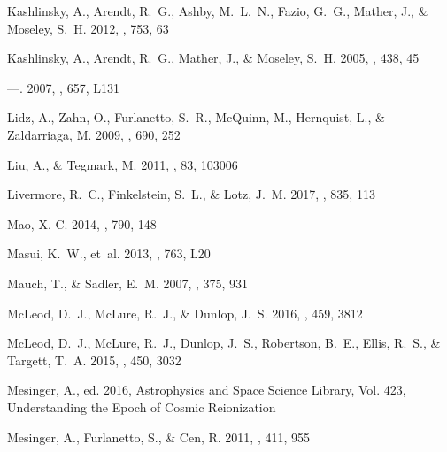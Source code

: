 \documentclass[numberedappendix]{emulateapj}
\begin{document}
\begin{thebibliography}{124}
{Kashlinsky}, A., {Arendt}, R.~G., {Ashby}, M.~L.~N., {Fazio}, G.~G., {Mather},
  J., \& {Moseley}, S.~H. 2012, \apj, 753, 63

{Kashlinsky}, A., {Arendt}, R.~G., {Mather}, J., \& {Moseley}, S.~H. 2005,
  \nat, 438, 45

---. 2007, \apjl, 657, L131

{Lidz}, A., {Zahn}, O., {Furlanetto}, S.~R., {McQuinn}, M., {Hernquist}, L., \&
  {Zaldarriaga}, M. 2009, \apj, 690, 252

{Liu}, A., \& {Tegmark}, M. 2011, \prd, 83, 103006

{Livermore}, R.~C., {Finkelstein}, S.~L., \& {Lotz}, J.~M. 2017, \apj, 835, 113

{Mao}, X.-C. 2014, \apj, 790, 148

{Masui}, K.~W., {et~al.} 2013, \apjl, 763, L20

{Mauch}, T., \& {Sadler}, E.~M. 2007, \mnras, 375, 931

{McLeod}, D.~J., {McLure}, R.~J., \& {Dunlop}, J.~S. 2016, \mnras, 459, 3812

{McLeod}, D.~J., {McLure}, R.~J., {Dunlop}, J.~S., {Robertson}, B.~E., {Ellis},
  R.~S., \& {Targett}, T.~A. 2015, \mnras, 450, 3032

{Mesinger}, A., ed. 2016, Astrophysics and Space Science Library, Vol. 423,
  {Understanding the Epoch of Cosmic Reionization}

{Mesinger}, A., {Furlanetto}, S., \& {Cen}, R. 2011, \mnras, 411, 955


\end{thebibliography}
\end{document}
